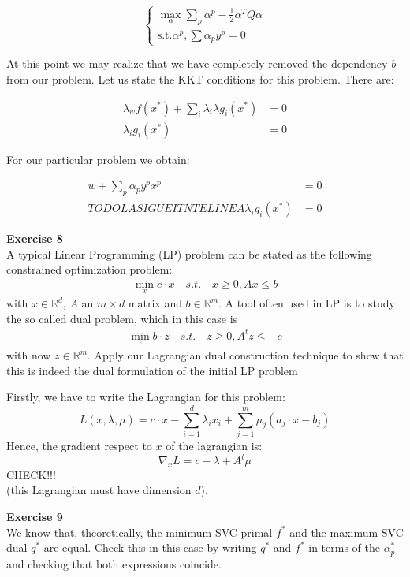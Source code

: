 \documentclass[11pt,table]{article}
\newenvironment{problem}[2][Exercise]
    { \begin{mdframed}[backgroundcolor=gray!20] \textbf{#1 #2} \\}
    {  \end{mdframed}}
\newcommand\R{\mathbb R}
\begin{document}
\[
\begin{cases}
	\max_{\alpha} \sum_p \alpha^p - \frac{1}{2} \alpha^T Q \alpha \\ 
	\text{s.t.} \alpha^p, \sum \alpha_p y^p = 0
\end{cases}
\]

At this point we may realize that we have completely removed the dependency \(b\) from our problem. Let us state the KKT conditions for this problem. There are:

\begin{align*}
	\lambda_w f(x^*) + \sum_i \lambda_i \lambda g_i (x^*) & = 0 \\
	\lambda_i g_i(x^*) & = 0
\end{align*}

For our particular problem we obtain:

\begin{align*}
	w + \sum_p \alpha_p y^p x^p & = 0 \\ TODO LA SIGUEITNTE LINEA
	\lambda_i g_i(x^*) & = 0
\end{align*}

\begin{problem}{8}
  A typical Linear Programming (LP) problem can be stated as the following constrained optimization problem:
  \begin{align*}
  \min_x c \cdot x \quad s.t. \quad x \geq 0, Ax \leq b
  \end{align*}
  with \(x \in \R^d\), \(A\) an \(m \times d\) matrix and \(b \in \R^m\). A tool often used in LP is to study the so called dual problem, which in this case is
  \begin{align*}
  \min_{z} b \cdot z \quad s.t. \quad z \geq 0, A^t z \leq -c
  \end{align*}
  with now \(z \in \R^m\). Apply our Lagrangian dual construction technique to show that this is indeed the dual formulation of the initial LP problem
\end{problem}

Firstly, we have to write the Lagrangian for this problem:
\[
L(x,\lambda,\mu) = c \cdot x -  \sum_{i=1}^d \lambda_i x_i  + \sum_{j=1}^m \mu_j(a_j \cdot x - b_j)  
\]
Hence, the gradient respect to \(x\) of the lagrangian is:
\[
\nabla_x L = c - \lambda + A^t \mu
\]
CHECK!!!\\
(this Lagrangian must have dimension \(d\)). 

\begin{problem}{9}
We know that, theoretically, the minimum SVC primal \(f^*\) and the maximum SVC dual \(q^*\) are equal. Check this in this case by writing \(q^*\) and \(f^*\) in terms of the \(\alpha_p^*\) and checking that both expressions coincide.
\end{problem}
\end{document}
